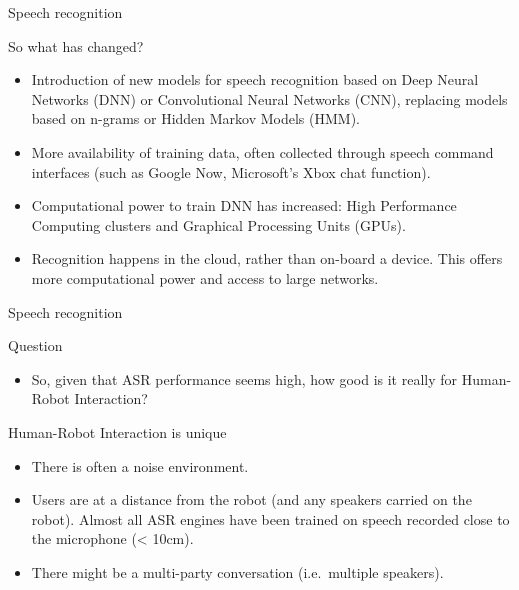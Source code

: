 \documentclass[compress]{beamer}
\providecommand{\tightlist}{%
  \setlength{\itemsep}{0pt}\setlength{\parskip}{0pt}}
\begin{document}
\begin{frame}{Speech recognition}

So what has changed?

\begin{itemize}
\tightlist
\item
  Introduction of new models for speech recognition based on Deep Neural
  Networks (DNN) or Convolutional Neural Networks (CNN), replacing
  models based on n-grams or Hidden Markov Models (HMM).
\item
  More availability of training data, often collected through speech
  command interfaces (such as Google Now, Microsoft's Xbox chat
  function).
\item
  Computational power to train DNN has increased: High Performance
  Computing clusters and Graphical Processing Units (GPUs).
\item
  Recognition happens in the cloud, rather than on-board a device. This
  offers more computational power and access to large networks.
\end{itemize}

\end{frame}

\begin{frame}{Speech recognition}

Question

\begin{itemize}
\tightlist
\item
  So, given that ASR performance seems high, how good is it really for
  Human-Robot Interaction?
\end{itemize}

Human-Robot Interaction is unique

\begin{itemize}
\tightlist
\item
  There is often a noise environment.
\item
  Users are at a distance from the robot (and any speakers carried on
  the robot). Almost all ASR engines have been trained on speech
  recorded close to the microphone (\textless{} 10cm).
\item
  There might be a multi-party conversation (i.e.~multiple speakers).
\end{itemize}

\end{frame}
\end{document}
